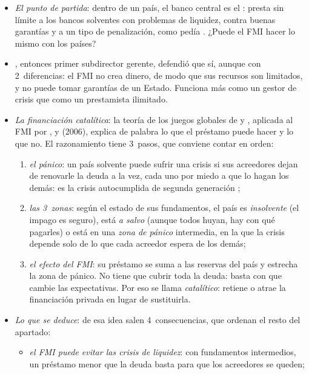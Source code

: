 \documentclass[11pt]{article}
\begin{document}
\begin{itemize}
\item \emph{El punto de partida}: dentro de un país, el banco central es el : presta sin límite a los bancos solventes con problemas de liquidez, contra buenas garantías y a un tipo de penalización, como pedía \textcite{Bagehot1873} . ¿Puede el FMI hacer lo mismo con los países?
\item \textcite{Fischer1999LOLR}, entonces primer subdirector gerente, defendió que sí, aunque con 2~diferencias: el FMI no crea dinero, de modo que sus recursos son limitados, y no puede tomar garantías de un Estado. Funciona más como un gestor de crisis que como un prestamista ilimitado.
\item \emph{La financiación catalítica}: la teoría de los juegos globales de  y , aplicada al FMI por ,  y  (2006), explica de palabra lo que el préstamo puede hacer y lo que no\nocite{CorsettiGuimaraesRoubini2006,MorrisShin2006}. El razonamiento tiene 3~pasos, que conviene contar en orden:
  \begin{enumerate}
  \item \emph{el pánico}: un país solvente puede sufrir una crisis si sus acreedores dejan de renovarle la deuda a la vez, cada uno por miedo a que lo hagan los demás: es la crisis autocumplida de segunda generación ;
  \item \emph{las 3~zonas}: según el estado de sus fundamentos, el país es \emph{insolvente} (el impago es seguro), está \emph{a salvo} (aunque todos huyan, hay con qué pagarles) o está en una \emph{zona de pánico} intermedia, en la que la crisis depende solo de lo que cada acreedor espera de los demás;
  \item \emph{el efecto del FMI}: su préstamo se suma a las reservas del país y estrecha la zona de pánico. No tiene que cubrir toda la deuda: basta con que cambie las expectativas. Por eso se llama \emph{catalítico}: retiene o atrae la financiación privada en lugar de sustituirla.
  \end{enumerate}
\item \emph{Lo que se deduce}: de esa idea salen 4~consecuencias, que ordenan el resto del apartado:
  \begin{itemize}
  \item \emph{el FMI puede evitar las crisis de liquidez}: con fundamentos intermedios, un préstamo menor que la deuda basta para que los acreedores se queden;

\end{itemize}
\end{itemize}
\end{document}
